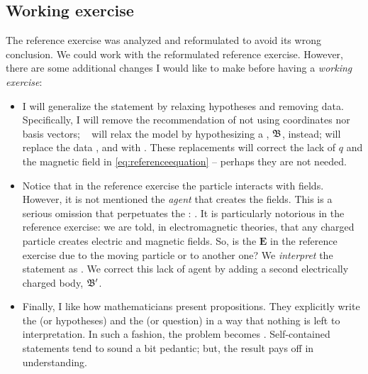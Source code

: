 \subsection{Working exercise}\label{sec:workingexercise}
%
The reference exercise was analyzed and reformulated to avoid its wrong conclusion. We could work with the reformulated reference exercise. However, there are some additional changes I would like to make before having a \emph{working exercise}:
%
\begin{itemize}
%
\item I will generalize the statement by relaxing hypotheses and removing data. Specifically, I will remove the recommendation of not using coordinates nor basis vectors;
%
~
%
will relax the  model by hypothesizing a , $\mathfrak{B}$, instead; will replace the data ,  and  with . These replacements will correct the lack of $q$ and the magnetic field in \cref{eq:referenceequation} -- perhaps they are not needed.
%
\item Notice that in the reference exercise the particle interacts with fields. However, it is not mentioned the \emph{agent} that creates the fields.
%
%
This is a serious omission that perpetuates the :  \cite{hestenes:1987}. It is particularly notorious in the reference exercise: we are told, in electromagnetic theories, that any charged particle creates electric and magnetic fields. So, is the $\mathbf{E}$ in the reference exercise due to the moving particle or to another one? We \emph{interpret} the statement as . We correct this lack of agent by adding a second electrically charged body, $\mathfrak{B}'$.
%
\item Finally, I like how mathematicians present propositions. They explicitly write the  (or hypotheses) and the  (or question) in a way that nothing is left to interpretation. In such a fashion, the problem becomes . Self-contained statements tend to sound a bit pedantic; but, the result pays off in understanding.
%
\end{itemize}

